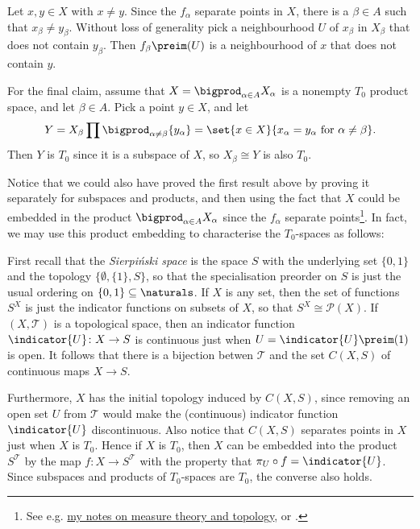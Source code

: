 \documentclass[article, a4paper, 11pt, oneside]{memoir}
\numberwithin{equation}{chapter}
\newcommand{\calT}{\mathcal{T}}
\newcommand{\calP}{\mathcal{P}}
\renewcommand{\powerset}[1]{\calP(#1)}
\begin{document}
\begin{proofof}[Proof 2]
    Let $x,y \in X$ with $x \neq y$. Since the $f_\alpha$ separate points in $X$, there is a $\beta \in A$ such that $x_\beta \neq y_\beta$. Without loss of generality pick a neighbourhood $U$ of $x_\beta$ in $X_\beta$ that does not contain $y_\beta$. Then $f_\beta\preim(U)$ is a neighbourhood of $x$ that does not contain $y$.

    For the final claim, assume that $X = \bigprod_{\alpha \in A} X_\alpha$ is a nonempty $T_0$ product space, and let $\beta \in A$. Pick a point $y \in X$, and let
    \begin{equation*}
        Y
            = X_\beta \prod \bigprod_{\alpha \neq \beta} \{y_\alpha\}
            = \set{x \in X}{x_\alpha = y_\alpha \text{ for } \alpha \neq \beta}.
    \end{equation*}
    Then $Y$ is $T_0$ since it is a subspace of $X$, so $X_\beta \cong Y$ is also $T_0$.
\end{proofof}
%
Notice that we could also have proved the first result above by proving it separately for subspaces and products, and then using the fact that $X$ could be embedded in the product $\bigprod_{\alpha \in A} X_\alpha$ since the $f_\alpha$ separate points\footnote{See e.g. \href{https://github.com/dnhansen/topology-measure-theory-notes}{my notes on measure theory and topology}, or \textcite[Theorem~8.12]{willard}.}. In fact, we may use this product embedding to characterise the $T_0$-spaces as follows:

First recall that the \emph{Sierpi\'nski space} is the space $S$ with the underlying set $\{0,1\}$ and the topology $\{\emptyset, \{1\}, S\}$, so that the specialisation preorder on $S$ is just the usual ordering on $\{0,1\} \subseteq \naturals$. If $X$ is any set, then the set of functions $S^X$ is just the indicator functions on subsets of $X$, so that $S^X \cong \powerset{X}$. If $(X,\calT)$ is a topological space, then an indicator function $\indicator{U} \colon X \to S$ is continuous just when $U = \indicator{U}\preim(1)$ is open. It follows that there is a bijection betwen $\calT$ and the set $C(X,S)$ of continuous maps $X \to S$.

Furthermore, $X$ has the initial topology induced by $C(X,S)$, since removing an open set $U$ from $\calT$ would make the (continuous) indicator function $\indicator{U}$ discontinuous. Also notice that $C(X,S)$ separates points in $X$ just when $X$ is $T_0$. Hence if $X$ is $T_0$, then $X$ can be embedded into the product $S^\calT$ by the map $f \colon X \to S^\calT$ with the property that $\pi_U \circ f = \indicator{U}$. Since subspaces and products of $T_0$-spaces are $T_0$, the converse also holds.
\end{document}

